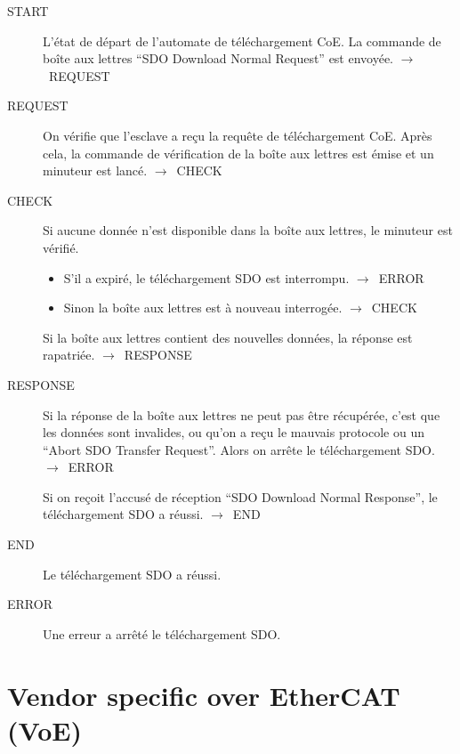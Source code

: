 \documentclass[a4paper,12pt,BCOR=6mm,bibtotoc,idxtotoc]{scrbook}
\begin{document}
\begin{description}
\item[START] L'\'etat de d\'epart de l'automate de t\'el\'echargement
  CoE. La commande de bo\^ite aux lettres ``SDO Download
  Normal Request'' est envoy\'ee. $\rightarrow$~REQUEST

\item[REQUEST] On v\'erifie que l'esclave a re\c{c}u la requ\^ete de t\'el\'echargement CoE. Apr\`es cela, la commande de v\'erification de la bo\^ite aux lettres est \'emise et un minuteur est lanc\'e. $\rightarrow$~CHECK

\item[CHECK] Si aucune donn\'ee n'est disponible
  dans la bo\^ite aux lettres, le minuteur est v\'erifi\'e.
  \begin{itemize}
  \item S'il a expir\'e, le t\'el\'echargement SDO est interrompu.
    $\rightarrow$~ERROR
  \item Sinon la bo\^ite aux lettres est \`a nouveau interrog\'ee.
    $\rightarrow$~CHECK
  \end{itemize}

  Si la bo\^ite aux lettres contient des nouvelles donn\'ees, la
  r\'eponse est rapatri\'ee.  $\rightarrow$~RESPONSE

\item[RESPONSE] Si la r\'eponse de la bo\^ite aux lettres ne peut pas
  \^etre r\'ecup\'er\'ee, c'est que les donn\'ees sont invalides, ou
  qu'on a re\c{c}u le mauvais protocole ou un ``Abort SDO Transfer
  Request''.  Alors on arr\^ete le t\'el\'echargement SDO.
  $\rightarrow$~ERROR

  Si on re\c{c}oit l'accus\'e de r\'eception ``SDO Download Normal
  Response'', le t\'el\'echargement SDO a r\'eussi. $\rightarrow$~END

\item[END] Le t\'el\'echargement SDO a r\'eussi.

\item[ERROR] Une erreur a arr\^et\'e le t\'el\'echargement SDO.

\end{description}


\section{Vendor specific over EtherCAT (VoE)}
\label{sec:voe}
\end{document}
